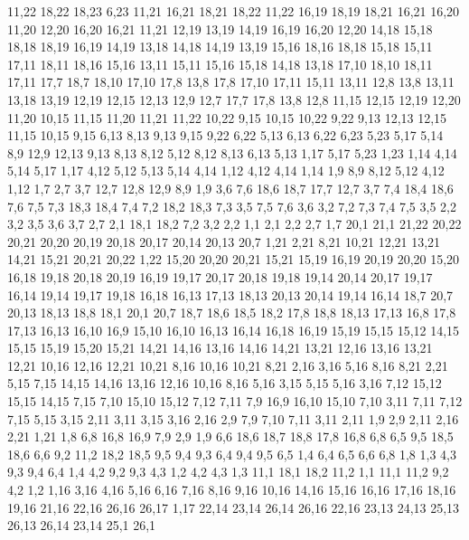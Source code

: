 11,22
18,22
18,23
6,23
%
11,21
16,21
18,21
18,22
11,22
%
16,19
18,19
18,21
16,21
16,20
%
11,20
12,20
16,20
16,21
11,21
%
12,19
13,19
14,19
16,19
16,20
12,20
%
14,18
15,18
18,18
18,19
16,19
14,19
%
13,18
14,18
14,19
13,19
%
15,16
18,16
18,18
15,18
%
15,11
17,11
18,11
18,16
15,16
%
13,11
15,11
15,16
15,18
14,18
13,18
%
17,10
18,10
18,11
17,11
%
17,7
18,7
18,10
17,10
17,8
%
13,8
17,8
17,10
17,11
15,11
13,11
%
12,8
13,8
13,11
13,18
13,19
12,19
12,15
12,13
12,9
%
12,7
17,7
17,8
13,8
12,8
%
11,15
12,15
12,19
12,20
11,20
%
10,15
11,15
11,20
11,21
11,22
10,22
%
9,15
10,15
10,22
9,22
%
9,13
12,13
12,15
11,15
10,15
9,15
%
6,13
8,13
9,13
9,15
9,22
6,22
%
5,13
6,13
6,22
6,23
5,23
5,17
5,14
%
8,9
12,9
12,13
9,13
8,13
8,12
%
5,12
8,12
8,13
6,13
5,13
%
1,17
5,17
5,23
1,23
%
1,14
4,14
5,14
5,17
1,17
%
4,12
5,12
5,13
5,14
4,14
%
1,12
4,12
4,14
1,14
%
1,9
8,9
8,12
5,12
4,12
1,12
%
1,7
2,7
3,7
12,7
12,8
12,9
8,9
1,9
%
3,6
7,6
18,6
18,7
17,7
12,7
3,7
%
7,4
18,4
18,6
7,6
7,5
%
7,3
18,3
18,4
7,4
%
7,2
18,2
18,3
7,3
%
3,5
7,5
7,6
3,6
%
3,2
7,2
7,3
7,4
7,5
3,5
%
2,2
3,2
3,5
3,6
3,7
2,7
%
2,1
18,1
18,2
7,2
3,2
2,2
%
1,1
2,1
2,2
2,7
1,7
20,1
21,1
21,22
20,22
20,21
20,20
20,19
20,18
20,17
20,14
20,13
20,7
%
1,21
2,21
8,21
10,21
12,21
13,21
14,21
15,21
20,21
20,22
1,22
%
15,20
20,20
20,21
15,21
%
15,19
16,19
20,19
20,20
15,20
%
16,18
19,18
20,18
20,19
16,19
%
19,17
20,17
20,18
19,18
%
19,14
20,14
20,17
19,17
%
16,14
19,14
19,17
19,18
16,18
%
16,13
17,13
18,13
20,13
20,14
19,14
16,14
%
18,7
20,7
20,13
18,13
18,8
%
18,1
20,1
20,7
18,7
18,6
18,5
18,2
%
17,8
18,8
18,13
17,13
%
16,8
17,8
17,13
16,13
16,10
16,9
%
15,10
16,10
16,13
16,14
16,18
16,19
15,19
15,15
15,12
%
14,15
15,15
15,19
15,20
15,21
14,21
14,16
%
13,16
14,16
14,21
13,21
%
12,16
13,16
13,21
12,21
%
10,16
12,16
12,21
10,21
%
8,16
10,16
10,21
8,21
%
2,16
3,16
5,16
8,16
8,21
2,21
%
5,15
7,15
14,15
14,16
13,16
12,16
10,16
8,16
5,16
%
3,15
5,15
5,16
3,16
%
7,12
15,12
15,15
14,15
7,15
%
7,10
15,10
15,12
7,12
7,11
%
7,9
16,9
16,10
15,10
7,10
%
3,11
7,11
7,12
7,15
5,15
3,15
%
2,11
3,11
3,15
3,16
2,16
%
2,9
7,9
7,10
7,11
3,11
2,11
%
1,9
2,9
2,11
2,16
2,21
1,21
%
1,8
6,8
16,8
16,9
7,9
2,9
1,9
%
6,6
18,6
18,7
18,8
17,8
16,8
6,8
%
6,5
9,5
18,5
18,6
6,6
%
9,2
11,2
18,2
18,5
9,5
9,4
9,3
%
6,4
9,4
9,5
6,5
%
1,4
6,4
6,5
6,6
6,8
1,8
%
1,3
4,3
9,3
9,4
6,4
1,4
%
4,2
9,2
9,3
4,3
%
1,2
4,2
4,3
1,3
%
11,1
18,1
18,2
11,2
%
1,1
11,1
11,2
9,2
4,2
1,2
1,16
3,16
4,16
5,16
6,16
7,16
8,16
9,16
10,16
14,16
15,16
16,16
17,16
18,16
19,16
21,16
22,16
26,16
26,17
1,17
%
22,14
23,14
26,14
26,16
22,16
%
23,13
24,13
25,13
26,13
26,14
23,14
%
25,1
26,1
